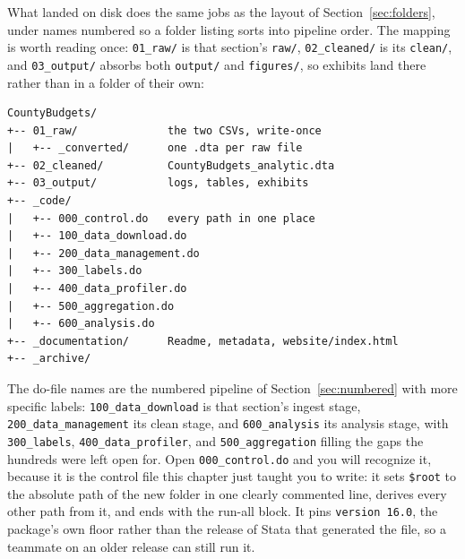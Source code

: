 \documentclass[
    a4paper,
    fontsize=10pt,
    twoside=true,
    numbers=noenddot,
]{kaobook}
\begin{document}
What landed on disk does the same jobs as the layout of Section~\ref{sec:folders}, under names numbered so a folder listing sorts into pipeline order. The mapping is worth reading once: \texttt{01\_raw/} is that section's \texttt{raw/}, \texttt{02\_cleaned/} is its \texttt{clean/}, and \texttt{03\_output/} absorbs both \texttt{output/} and \texttt{figures/}, so exhibits land there rather than in a folder of their own:
\par
{\footnotesize
\begin{verbatim}
CountyBudgets/
+-- 01_raw/              the two CSVs, write-once
|   +-- _converted/      one .dta per raw file
+-- 02_cleaned/          CountyBudgets_analytic.dta
+-- 03_output/           logs, tables, exhibits
+-- _code/
|   +-- 000_control.do   every path in one place
|   +-- 100_data_download.do
|   +-- 200_data_management.do
|   +-- 300_labels.do
|   +-- 400_data_profiler.do
|   +-- 500_aggregation.do
|   +-- 600_analysis.do
+-- _documentation/      Readme, metadata, website/index.html
+-- _archive/
\end{verbatim}
}
The do-file names are the numbered pipeline of Section~\ref{sec:numbered} with more specific labels: \texttt{100\_data\_download} is that section's ingest stage, \texttt{200\_data\_management} its clean stage, and \texttt{600\_analysis} its analysis stage, with \texttt{300\_labels}, \texttt{400\_data\_profiler}, and \texttt{500\_aggregation} filling the gaps the hundreds were left open for. Open \texttt{000\_control.do} and you will recognize it, because it is the control file this chapter just taught you to write: it sets \texttt{\$root} to the absolute path of the new folder in one clearly commented line, derives every other path from it, and ends with the run-all block. It pins \texttt{version 16.0}, the package's own floor rather than the release of Stata that generated the file, so a teammate on an older release can still run it.
\end{document}
